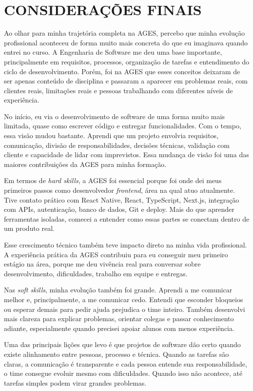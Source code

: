 \chapter[Considerações Finais]{CONSIDERAÇÕES FINAIS}

Ao olhar para minha trajetória completa na AGES, percebo que minha evolução profissional aconteceu de forma muito mais concreta do que eu imaginava quando entrei no curso. A Engenharia de Software me deu uma base importante, principalmente em requisitos, processos, organização de tarefas e entendimento do ciclo de desenvolvimento. Porém, foi na AGES que esses conceitos deixaram de ser apenas conteúdo de disciplina e passaram a aparecer em problemas reais, com clientes reais, limitações reais e pessoas trabalhando com diferentes níveis de experiência.

No início, eu via o desenvolvimento de software de uma forma muito mais limitada, quase como escrever código e entregar funcionalidades. Com o tempo, essa visão mudou bastante. Aprendi que um projeto envolvia requisitos, comunicação, divisão de responsabilidades, decisões técnicas, validação com cliente e capacidade de lidar com imprevistos. Essa mudança de visão foi uma das maiores contribuições da AGES para minha formação.

Em termos de \textit{hard skills}, a AGES foi essencial porque foi onde dei meus primeiros passos como desenvolvedor \textit{frontend}, área na qual atuo atualmente. Tive contato prático com React Native, React, TypeScript, Next.js, integração com APIs, autenticação, banco de dados, Git e deploy. Mais do que aprender ferramentas isoladas, comecei a entender como essas partes se conectam dentro de um produto real.

Esse crescimento técnico também teve impacto direto na minha vida profissional. A experiência prática da AGES contribuiu para eu conseguir meu primeiro estágio na área, porque me deu vivência real para conversar sobre desenvolvimento, dificuldades, trabalho em equipe e entregas.

Nas \textit{soft skills}, minha evolução também foi grande. Aprendi a me comunicar melhor e, principalmente, a me comunicar cedo. Entendi que esconder bloqueios ou esperar demais para pedir ajuda prejudica o time inteiro. Também desenvolvi mais clareza para explicar problemas, orientar colegas e passar conhecimento adiante, especialmente quando precisei apoiar alunos com menos experiência.

Uma das principais lições que levo é que projetos de software dão certo quando existe alinhamento entre pessoas, processo e técnica. Quando as tarefas são claras, a comunicação é transparente e cada pessoa entende sua responsabilidade, o time consegue evoluir mesmo com dificuldades. Quando isso não acontece, até tarefas simples podem virar grandes problemas.

